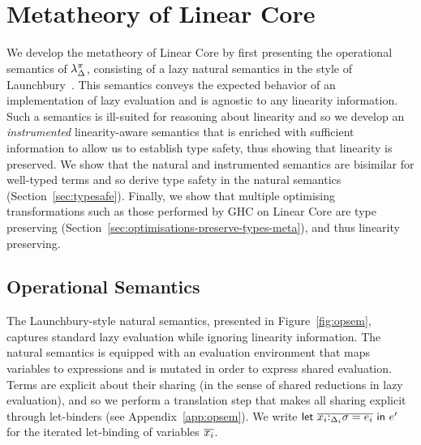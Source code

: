 \documentclass[acmsmall,review,screen]{acmart}
\newcommand{\llet}[2]{\mathsf{let}~#1~\mathsf{in}~#2}
\begin{document}
\section{Metatheory of Linear Core\label{sec:main:metatheory}}

We develop the metatheory of Linear Core by first 
presenting the operational semantics of $\lambda^\pi_\Delta$,
consisting of a lazy natural semantics in the
style of Launchbury~\cite{10.1145/158511.158618}.
This semantics conveys the expected behavior of an implementation of
lazy evaluation and is agnostic to any linearity information.
Such a semantics is ill-suited for reasoning about
linearity and so we develop an \emph{instrumented} linearity-aware semantics that is
enriched with sufficient information to allow us to establish type
safety, thus showing that linearity is preserved. We show that the natural
and instrumented semantics are bisimilar for well-typed terms and so
derive type safety in the natural semantics
(Section~\ref{sec:typesafe}). Finally, we show that multiple optimising
transformations such as those performed by GHC on Linear Core are
type preserving
(Section~\ref{sec:optimisations-preserve-types-meta}), and thus
linearity preserving.

\subsection{Operational Semantics}

The Launchbury-style natural semantics, presented in Figure~\ref{fig:opsem}, captures
standard lazy evaluation while ignoring linearity information.
%
The natural semantics is equipped with an evaluation environment that
maps variables to expressions and is
mutated in order to express shared evaluation. Terms are explicit about
their sharing (in the sense of shared reductions in lazy evaluation),
and so we perform a translation step that makes all sharing explicit
through let-binders (see Appendix~\ref{app:opsem}).
We write $\llet{\ov{x_i{:}_{\Delta_i}\sigma = e_i}}{e'}$ for the iterated
let-binding of variables $\overline{x_i}$. 
\end{document}
